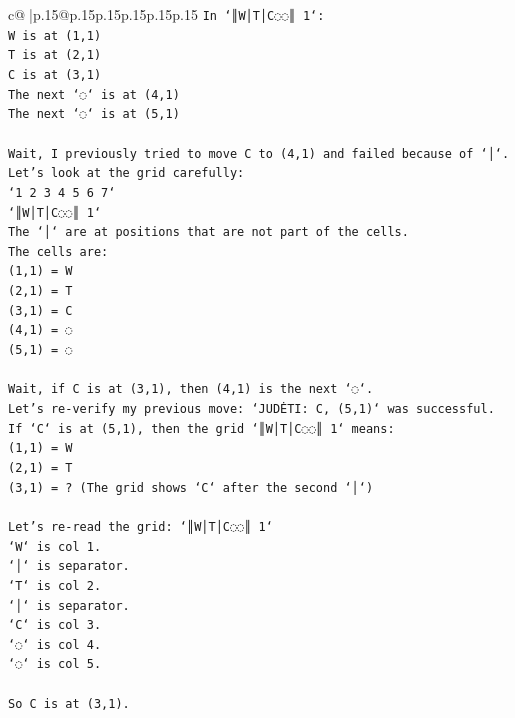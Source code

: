 \documentclass{article}
\begin{document}
{\begin{supertabular}{c@{$\;$}|p{.15\linewidth}@{}p{.15\linewidth}p{.15\linewidth}p{.15\linewidth}p{.15\linewidth}p{.15\linewidth}}
{{{\texttt{In `║W│T│C◌◌║ 1`:} \\
\texttt{W is at (1,1)} \\
\texttt{T is at (2,1)} \\
\texttt{C is at (3,1)} \\
\texttt{The next `◌` is at (4,1)} \\
\texttt{The next `◌` is at (5,1)} \\
\\ 
\texttt{Wait, I previously tried to move C to (4,1) and failed because of `│`.} \\
\texttt{Let's look at the grid carefully:} \\
\texttt{`1 2 3 4 5 6 7`} \\
\texttt{`║W│T│C◌◌║ 1`} \\
\texttt{The `│` are at positions that are not part of the cells.} \\
\texttt{The cells are:} \\
\texttt{(1,1) = W} \\
\texttt{(2,1) = T} \\
\texttt{(3,1) = C} \\
\texttt{(4,1) = ◌} \\
\texttt{(5,1) = ◌} \\
\\ 
\texttt{Wait, if C is at (3,1), then (4,1) is the next `◌`.} \\
\texttt{Let's re{-}verify my previous move: `JUDĖTI: C, (5,1)` was successful.} \\
\texttt{If `C` is at (5,1), then the grid `║W│T│C◌◌║ 1` means:} \\
\texttt{(1,1) = W} \\
\texttt{(2,1) = T} \\
\texttt{(3,1) = ? (The grid shows `C` after the second `│`)} \\
\\ 
\texttt{Let's re{-}read the grid: `║W│T│C◌◌║ 1`} \\
\texttt{`W` is col 1.} \\
\texttt{`│` is separator.} \\
\texttt{`T` is col 2.} \\
\texttt{`│` is separator.} \\
\texttt{`C` is col 3.} \\
\texttt{`◌` is col 4.} \\
\texttt{`◌` is col 5.} \\
\\ 
\texttt{So C is at (3,1).} \\
}}}
\end{supertabular}}
\end{document}
